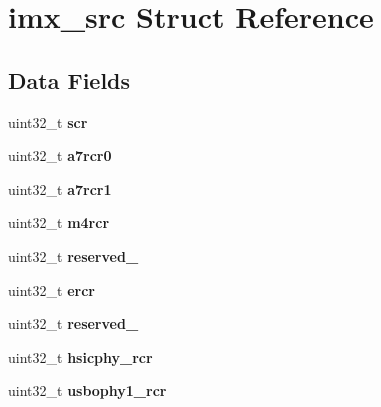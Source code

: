 \hypertarget{structimx__src}{}\section{imx\+\_\+src Struct Reference}
\label{structimx__src}
\subsection*{Data Fields}
\begin{DoxyCompactItemize}
\item 
\mbox{\label{structimx__src_a87747b7cdcf021d3ec5044f48c813e2e}} 
uint32\+\_\+t {\bfseries scr}
\item 
\mbox{\label{structimx__src_abf5b97a54c86834384eecb596ea10b4d}} 
uint32\+\_\+t {\bfseries a7rcr0}
\item 
\mbox{\label{structimx__src_a5ee312f733cd153c07d38f7d79484fc6}} 
uint32\+\_\+t {\bfseries a7rcr1}
\item 
\mbox{\label{structimx__src_a46008bd329c7de639d5f6111ee236868}} 
uint32\+\_\+t {\bfseries m4rcr}
\item 
\mbox{\label{structimx__src_a32b25386fd2ceafc374abaab275bd69d}} 
uint32\+\_\+t {\bfseries reserved\+\_}
\item 
\mbox{\label{structimx__src_a2bc794eba20355038babf1ac013017c6}} 
uint32\+\_\+t {\bfseries ercr}
\item 
\mbox{\label{structimx__src_ab1563ba877257358e9eff04c146ac4dc}} 
uint32\+\_\+t {\bfseries reserved\+\_}
\item 
\mbox{\label{structimx__src_a2d4741598e3518f33e48900eaf786889}} 
uint32\+\_\+t {\bfseries hsicphy\+\_\+rcr}
\item 
\mbox{\label{structimx__src_a7d4919ff76c4c0da903a319e8a127915}} 
uint32\+\_\+t {\bfseries usbophy1\+\_\+rcr}
\item 
\mbox{\label{structimx__src_afb45db83bc8e78e3001b431495523a4a}} 

\end{DoxyCompactItemize}
